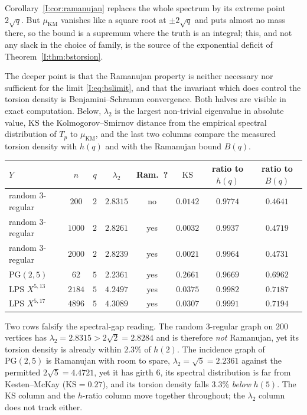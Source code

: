 \begin{remark}\label{I:rem:bsnumerics}
Corollary~\ref{I:cor:ramanujan} replaces the whole spectrum by its extreme point
$2\sqrt q$. But $\mu_{\mathrm{KM}}$ vanishes like a square root at $\pm2\sqrt q$ and puts
almost no mass there, so the bound is a supremum where the truth is an integral; this,
and not any slack in the choice of family, is the source of the exponential deficit of
Theorem~\ref{I:thm:bstorsion}.

The deeper point is that the Ramanujan property is neither necessary nor sufficient for
the limit \eqref{I:eq:bslimit}, and that the invariant which does control the torsion
density is Benjamini--Schramm convergence. Both halves are visible in exact computation.
Below, $\lambda_2$ is the largest non-trivial eigenvalue in absolute value,
$\mathrm{KS}$ the Kolmogorov--Smirnov distance from the empirical spectral distribution
of $T_p$ to $\mu_{\mathrm{KM}}$, and the last two columns compare the measured torsion
density with $h(q)$ and with the Ramanujan bound $B(q)$.
\begin{center}\small
\renewcommand{\arraystretch}{1.15}\setlength{\tabcolsep}{5pt}
\begin{tabular}{lccccccc}
\toprule
$Y$ & $n$ & $q$ & $\lambda_2$ & Ram.\ ? & $\mathrm{KS}$
& ratio to $h(q)$ & ratio to $B(q)$\\
\midrule
random $3$-regular   & $200$  & $2$ & $2.8315$ & no  & $0.0142$ & $0.9774$ & $0.4641$\\
random $3$-regular   & $1000$ & $2$ & $2.8261$ & yes & $0.0032$ & $0.9937$ & $0.4719$\\
random $3$-regular   & $2000$ & $2$ & $2.8239$ & yes & $0.0021$ & $0.9964$ & $0.4731$\\
$\mathrm{PG}(2,5)$   & $62$   & $5$ & $2.2361$ & yes & $0.2661$ & $0.9669$ & $0.6962$\\
LPS $X^{5,13}$       & $2184$ & $5$ & $4.2497$ & yes & $0.0375$ & $0.9982$ & $0.7187$\\
LPS $X^{5,17}$       & $4896$ & $5$ & $4.3089$ & yes & $0.0307$ & $0.9991$ & $0.7194$\\
\bottomrule
\end{tabular}
\end{center}
Two rows falsify the spectral-gap reading. The random $3$-regular graph on $200$
vertices has $\lambda_2=2.8315>2\sqrt2=2.8284$ and is therefore \emph{not} Ramanujan,
yet its torsion density is already within $2.3\%$ of $h(2)$. The incidence graph of
$\mathrm{PG}(2,5)$ is Ramanujan with room to spare, $\lambda_2=\sqrt5=2.2361$ against
the permitted $2\sqrt5=4.4721$, yet it has girth $6$, its spectral distribution is far
from Kesten--McKay ($\mathrm{KS}=0.27$), and its torsion density falls $3.3\%$
\emph{below} $h(5)$. The $\mathrm{KS}$ column and the $h$-ratio column move together
throughout; the $\lambda_2$ column does not track either.


\end{remark}
